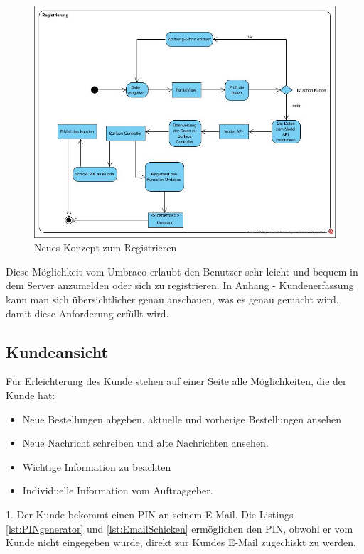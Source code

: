 \begin{figure}[h]
	\centering
	\includegraphics[width=1\linewidth]{Graphics/Registrierung.JPG}
	\caption[neues Konzept: Registrierung]{Neues Konzept zum Registrieren}
	\label{fig:Registrierung}
\end{figure}

Diese Möglichkeit vom Umbraco erlaubt den Benutzer sehr leicht und bequem in dem Server anzumelden oder sich zu registrieren.
In Anhang - Kundenerfassung kann man sich übersichtlicher genau anschauen, was es genau gemacht wird, damit diese Anforderung erfüllt wird.

\pagebreak

\subsection{Kundeansicht}
Für Erleichterung des Kunde stehen auf einer Seite alle Möglichkeiten, die der Kunde hat: 

\begin{itemize}	
	\item Neue Bestellungen abgeben, aktuelle und vorherige Bestellungen ansehen
	\item Neue Nachricht schreiben und alte Nachrichten ansehen.
	\item Wichtige Information zu beachten
	\item Individuelle Information vom Auftraggeber.
\end{itemize}
1. Der Kunde bekommt einen PIN an seinem E-Mail. Die Listings \ref{lst:PINgenerator} und \ref{lst:EmailSchicken} ermöglichen den PIN, obwohl er vom Kunde nicht eingegeben wurde, direkt zur Kundes E-Mail zugechiskt zu werden.

